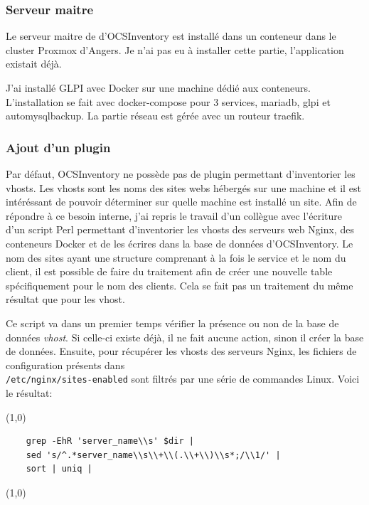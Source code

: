 \documentclass[12pt]{article}
\begin{document}
\newpage
\subsubsection{Serveur maitre}
Le serveur maitre de d'OCSInventory est installé dans un conteneur dans le cluster Proxmox d'Angers.
Je n'ai pas eu à installer cette partie, l'application existait déjà.

J'ai installé GLPI avec Docker sur une machine dédié aux conteneurs.
L'installation se fait avec docker-compose pour 3 services, mariadb, glpi et automysqlbackup.
La partie réseau est gérée avec un routeur traefik.

\subsubsection{Ajout d'un plugin}
Par défaut, OCSInventory ne possède pas de plugin permettant d'inventorier les vhosts. 
Les vhosts sont les noms des sites webs hébergés sur une machine et il est intéréssant de pouvoir déterminer sur quelle machine est installé un site. 
Afin de répondre à ce besoin interne, j'ai repris le travail d'un collègue avec l'écriture d'un script Perl permettant d'inventorier les vhosts des serveurs web Nginx, des conteneurs Docker et de les écrires dans la base de données d'OCSInventory.
Le nom des sites ayant une structure comprenant à la fois le service et le nom du client, il est possible de faire du traitement afin de créer une nouvelle table spécifiquement pour le nom des clients.
Cela se fait pas un traitement du même résultat que pour les vhost.

Ce script va dans un premier temps vérifier la présence ou non de la base de données \textit{vhost}.
Si celle-ci existe déjà, il ne fait aucune action, sinon il créer la base de données.
Ensuite, pour récupérer les vhosts des serveurs Nginx, les fichiers de configuration présents dans \\ \verb|/etc/nginx/sites-enabled| sont filtrés par une série de commandes Linux.
Voici le résultat:

\begin{hilite}
\line(1,0){\textwidth}
    \begin{verbatim}
    grep -EhR 'server_name\\s' $dir | 
    sed 's/^.*server_name\\s\\+\\(.\\+\\)\\s*;/\\1/' |
    sort | uniq |
    \end{verbatim}
\line(1,0){\textwidth}
\end{hilite}
\end{document}
